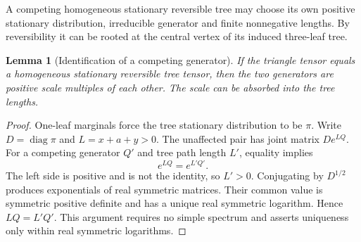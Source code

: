 \documentclass[11pt]{article}
\newtheorem{lemma}[theorem]{Lemma}
\theoremstyle{definition}
\theoremstyle{remark}
\DeclareMathOperator{\diag}{diag}
\begin{document}
A competing homogeneous stationary reversible tree may choose its own
positive stationary distribution, irreducible generator and finite
nonnegative lengths. By reversibility it can be rooted at the central
vertex of its induced three-leaf tree.

\begin{lemma}[Identification of a competing generator]\label{lem:generator}
If the triangle tensor equals a homogeneous stationary reversible tree
tensor, then the two generators are positive scale multiples of each
other. The scale can be absorbed into the tree lengths.
\end{lemma}
\begin{proof}
One-leaf marginals force the tree stationary distribution to be $\pi$.
Write $D=\diag\pi$ and $L=x+a+y>0$. The unaffected pair has joint matrix
$De^{LQ}$. For a competing generator $Q'$ and tree path length $L'$,
equality implies
\[
 e^{LQ}=e^{L'Q'}.
\]
The left side is positive and is not the identity, so $L'>0$.
Conjugating by $D^{1/2}$ produces exponentials of real symmetric matrices.
Their common value is symmetric positive definite and has a unique real
symmetric logarithm. Hence $LQ=L'Q'$. This argument requires no simple
spectrum and asserts uniqueness only within real symmetric logarithms.
\end{proof}
\end{document}
